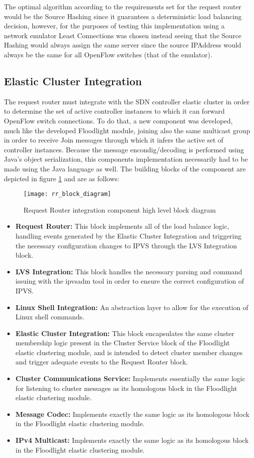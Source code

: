 %
The optimal algorithm according to the requirements set for the request router would be the Source Hashing since it guarantees a deterministic load balancing decision, however, for the purposes of testing this implementation using a network emulator Least Connections was chosen instead seeing that the Source Hashing would always assign the same server since the source \gls{IPAddress} would always be the same for all OpenFlow switches (that of the emulator).
%
\subsection{Elastic Cluster Integration}
The request router must integrate with the \gls{SDN} controller elastic cluster in order to determine the set of active controller instances to which it can forward OpenFlow switch connections.
To do that, a new component was developed, much like the developed Floodlight module, joining also the same multicast group in order to receive Join messages through which it infers the active set of controller instances.
Because the message encondig/decoding is performed using Java's object serialization, this components implementation necessarily had to be made using the Java language as well.
The building blocks of the component are depicted in figure \ref{fig:rr_block_diagram} and are as follows:
%
\begin{figure}
	\centering
	\texttt{[image: rr\_block\_diagram]}
	\caption{Request Router integration component high level block diagram}
	\label{fig:rr_block_diagram}
\end{figure}
%
\begin{itemize}
	\item \textbf{Request Router:} This block implements all of the load balance logic, handling events generated by the Elastic Cluster Integration and triggering the necessary configuration changes to \gls{IPVS} through the LVS Integration block.
	\item \textbf{LVS Integration:} This block handles the necessary parsing and command issuing with the ipvsadm tool in order to ensure the correct configuration of \gls{IPVS}. 
	\item \textbf{Linux Shell Integration:} An abstraction layer to allow for the execution of Linux shell commands.
	\item \textbf{Elastic Cluster Integration:} This block encapsulates the same cluster membership logic present in the Cluster Service block of the Floodlight elastic clustering module, and is intended to detect cluster member changes and trigger adequate events to the Request Router block.
	\item \textbf{Cluster Communications Service:} Implements essentially the same logic for listening to cluster messages as its homologous block in the Floodlight elastic clustering module.
	\item \textbf{Message Codec:} Implements exactly the same logic as its homologous block in the Floodlight elastic clustering module.
	\item \textbf{IPv4 Multicast:} Implements exactly the same logic as its homologous block in the Floodlight elastic clustering module.
\end{itemize}
